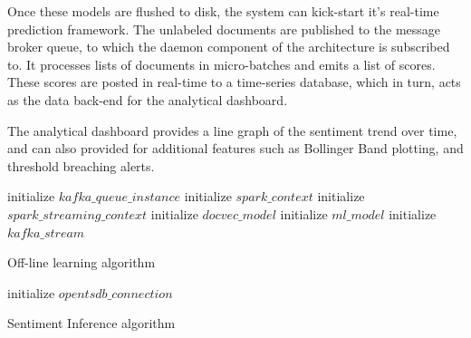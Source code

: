 \documentclass[conference]{IEEEtran}
\begin{document}
        Once these models are flushed to disk, the system can kick-start it's real-time prediction framework. 
        The unlabeled documents are published to the message broker queue, to which the daemon component of the architecture is subscribed to. 
        It processes lists of documents in micro-batches and emits a list of scores. 
        These scores are posted in real-time to a time-series database, which in turn, acts as the data back-end for the analytical dashboard.

        The analytical dashboard provides a line graph of the sentiment trend over time, and can also provided for additional features such as Bollinger Band plotting, and threshold breaching alerts.

\vspace{5mm}

\begin{algorithm}[ht] \label{online_module}
    \DontPrintSemicolon 
    \;
    initialize $kafka\_queue\_instance$\;
    initialize $spark\_context$\;
    initialize $spark\_streaming\_context$\;
    \;
    initialize $docvec\_model$\;
    initialize $ml\_model$\;
    initialize $kafka\_stream$\;
    \;
    \;
    \caption{Off-line learning algorithm}
\end{algorithm}

\begin{algorithm}[hb] \label{infer_sentiment}
    \DontPrintSemicolon 
    initialize $opentsdb\_connection$
    \;
    \;
    \caption{Sentiment Inference algorithm}
\end{algorithm}
\end{document}

